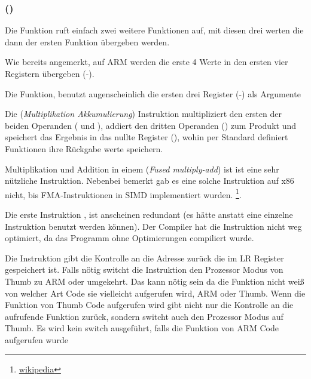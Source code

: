 \subsubsection{\NonOptimizingKeilVI (\ARMMode)}



Die \main Funktion ruft einfach zwei weitere Funktionen auf, mit diesen drei werten die dann
der ersten Funktion übergeben werden.

Wie bereits angemerkt, auf ARM werden die erste 4 Werte in den ersten vier Registern übergeben (-).

Die \ttf Funktion, benutzt augenscheinlich die ersten drei Register (-) als Argumente


Die  (\emph{Multiplikation Akkumulierung})
Instruktion multipliziert den ersten der beiden Operanden ( und ), addiert den dritten Operanden
() zum Produkt und speichert das Ergebnis in das nullte Register (), wohin per Standard definiert
Funktionen ihre Rückgabe werte speichern.

Multiplikation und Addition in einem (\emph{Fused multiply-add})
ist ist eine sehr nützliche Instruktion. Nebenbei bemerkt gab es eine solche Instruktion 
auf x86 nicht, bis FMA-Instruktionen in SIMD implementiert wurden.
\footnote{\href{http://go.yurichev.com/17103}{wikipedia}}.

Die erste Instruktion ,
ist anscheinen redundant (es hätte anstatt eine einzelne  Instruktion benutzt werden können).
Der Compiler hat die Instruktion nicht weg optimiert, da das Programm ohne Optimierungen compiliert wurde.


Die  Instruktion gibt die Kontrolle an die Adresse zurück die im \ac{LR} Register gespeichert ist.
Falls nötig switcht die Instruktion den Prozessor Modus von Thumb zu ARM oder umgekehrt.
Das kann nötig sein da die \ttf Funktion nicht weiß von welcher Art Code sie vielleicht aufgerufen wird,
ARM oder Thumb.
Wenn die Funktion von Thumb Code aufgerufen wird gibt  nicht nur 
die Kontrolle an die aufrufende Funktion zurück, sondern switcht auch den Prozessor Modus auf 
Thumb. Es wird kein switch ausgeführt, falls die Funktion von ARM Code aufgerufen wurde  

